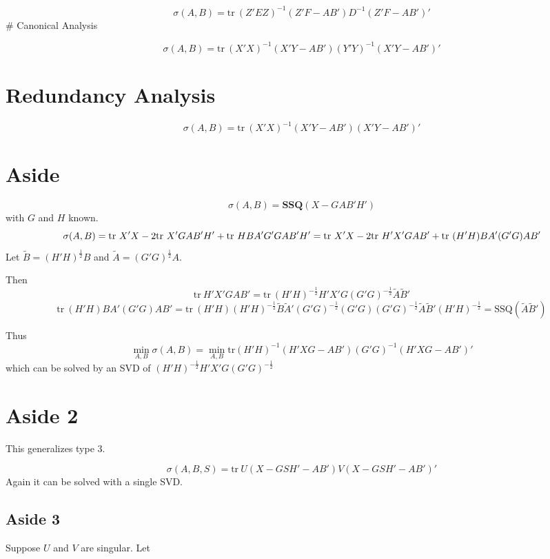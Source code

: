 \documentclass[
  12pt,
  letterpaper,
  DIV=11,
  numbers=noendperiod]{scrartcl}
\begin{document}
\[
\sigma(A,B)=\text{tr}\ (Z'EZ)^{-1}(Z'F-AB')D^{-1}(Z'F-AB')'
\] \# Canonical Analysis

\[
\sigma(A,B)=\text{tr}\ (X'X)^{-1}(X'Y-AB')(Y'Y)^{-1}(X'Y-AB')'
\]

\section{Redundancy Analysis}\label{redundancy-analysis}

\[
\sigma(A,B)=\text{tr}\ (X'X)^{-1}(X'Y-AB')(X'Y-AB')'
\]

\section{Aside}\label{aside}

\[
\sigma(A,B)=\mathbf{SSQ}(X-GAB'H')
\] with \(G\) and \(H\) known. \[
\sigma(A,B)=\text{tr}\ X'X-2\text{tr}\ X'GAB'H'+\text{tr}\ HBA'G'GAB'H'=\\
\text{tr}\ X'X-2\text{tr}\ H'X'GAB'+\text{tr}\ (H'H)BA'(G'G)AB'
\] Let \(\tilde B=(H'H)^\frac12 B\) and \(\tilde A=(G'G)^\frac12 A\).

Then \[
\text{tr}\ H'X'GAB'=\text{tr}\ (H'H)^{-\frac12}H'X'G(G'G)^{-\frac12}\tilde A\tilde B'
\] \[
\text{tr}\ (H'H)BA'(G'G)AB'=\text{tr}\ (H'H)(H'H)^{-\frac12}\tilde B\tilde A'(G'G)^{-\frac12}(G'G)(G'G)^{-\frac12}\tilde A\tilde B'(H'H)^{-\frac12}=\text{SSQ}(\tilde A\tilde B')
\]

Thus \[
\min_{A,B}\sigma(A,B)=\min_{A,B}\text{tr}(H'H)^{-1}(H'XG-AB')(G'G)^{-1}(H'XG-AB')'
\] which can be solved by an SVD of
\((H'H)^{-\frac12}H'X'G(G'G)^{-\frac12}\)

\section{Aside 2}\label{aside-2}

This generalizes type 3.

\[
\sigma(A,B,S)=\text{tr}\ U(X-GSH'-AB')V(X-GSH'-AB')'
\] Again it can be solved with a single SVD.

\subsection{Aside 3}\label{aside-3}

Suppose \(U\) and \(V\) are singular. Let
\end{document}
